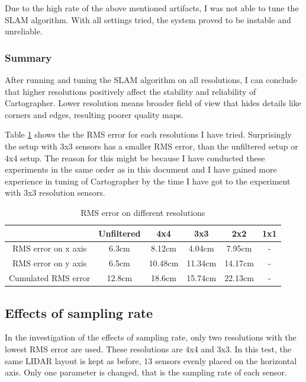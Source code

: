 Due to the high rate of the above mentioned artifacts, I was not able to tune the SLAM algorithm. With all 
settings tried, the system proved to be instable and unreliable.





\subsubsection{Summary}
After running and tuning the SLAM algorithm on all resolutions, I can conclude that higher resolutions
positively affect the stability and reliability of Cartographer. Lower resolution means broader field of 
view that hides details like corners and edges, resulting poorer quality maps.

Table \ref{tab:error_on_different_resolutions} shows the the RMS error for each resolutions I have tried.
Surprisingly the setup with 3x3 sensors has a smaller RMS error, than the unfiltered setup or 4x4 setup.
The reason for this might be because I have conducted these experiments in the same order as in this document
and I have gained more experience in tuning of Cartographer by the time I have got to the experiment with 3x3
resolution sensors. 

\begin{table}[ht]
	\centering
	\begin{tabular}{||c c c c c c||}
		\hline
                            & Unfiltered    & 4x4     & 3x3     & 2x2     & 1x1 \\
		\hline\hline
        RMS error on x axis & 6.3cm         & 8.12cm  & 4.04cm  & 7.95cm  & -\\
        \hline
        RMS error on y axis & 6.5cm         & 10.48cm & 11.34cm & 14.17cm & -\\
		\hline
        Cumulated RMS error & 12.8cm        & 18.6cm  & 15.74cm & 22.13cm & -\\
		\hline
	\end{tabular}
	\caption{RMS error on different resolutions}
	\label{tab:error_on_different_resolutions}
\end{table}






\subsection{Effects of sampling rate}
In the investigation of the effects of sampling rate, only two resolutions with the lowest RMS error
are used. These resolutions are 4x4 and 3x3. In this test, the same LIDAR layout is kept as before,
13 sensors evenly placed on the horizontal axis. Only one parameter is changed, that is the sampling 
rate of each sensor. 

